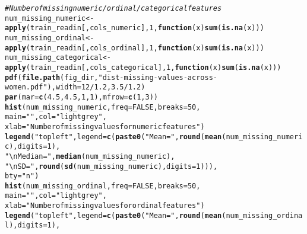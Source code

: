 \documentclass{article}\usepackage[]{graphicx}\usepackage[]{color}
\makeatletter
\newcommand{\hlnum}[1]{\textcolor[rgb]{0.686,0.059,0.569}{#1}}%
\newcommand{\hlstr}[1]{\textcolor[rgb]{0.192,0.494,0.8}{#1}}%
\newcommand{\hlcom}[1]{\textcolor[rgb]{0.678,0.584,0.686}{\textit{#1}}}%
\newcommand{\hlopt}[1]{\textcolor[rgb]{0,0,0}{#1}}%
\newcommand{\hlstd}[1]{\textcolor[rgb]{0.345,0.345,0.345}{#1}}%
\newcommand{\hlkwa}[1]{\textcolor[rgb]{0.161,0.373,0.58}{\textbf{#1}}}%
\newcommand{\hlkwb}[1]{\textcolor[rgb]{0.69,0.353,0.396}{#1}}%
\newcommand{\hlkwc}[1]{\textcolor[rgb]{0.333,0.667,0.333}{#1}}%
\newcommand{\hlkwd}[1]{\textcolor[rgb]{0.737,0.353,0.396}{\textbf{#1}}}%
\newenvironment{kframe}{%
 \def\at@end@of@kframe{}%
 \ifinner\ifhmode%
  \def\at@end@of@kframe{\end{minipage}}%
  \begin{minipage}{\columnwidth}%
 \fi\fi%
 \def\FrameCommand##1{\hskip\@totalleftmargin \hskip-\fboxsep
 \colorbox{shadecolor}{##1}\hskip-\fboxsep
     \hskip-\linewidth \hskip-\@totalleftmargin \hskip\columnwidth}%
 \MakeFramed {\advance\hsize-\width
   \@totalleftmargin\z@ \linewidth\hsize
   \@setminipage}}%
 {\par\unskip\endMakeFramed%
 \at@end@of@kframe}
\newenvironment{knitrout}{}{} %
\makeatother
\begin{document}
\begin{knitrout}
\begin{kframe}
\begin{alltt}
\hlcom{# Number of missing numeric/ordinal/categorical features}
\hlstd{num_missing_numeric} \hlkwb{<-} \hlkwd{apply}\hlstd{(train_readin[, cols_numeric],} \hlnum{1}\hlstd{,} \hlkwa{function}\hlstd{(}\hlkwc{x}\hlstd{)} \hlkwd{sum}\hlstd{(}\hlkwd{is.na}\hlstd{(x)))}
\hlstd{num_missing_ordinal} \hlkwb{<-} \hlkwd{apply}\hlstd{(train_readin[, cols_ordinal],} \hlnum{1}\hlstd{,} \hlkwa{function}\hlstd{(}\hlkwc{x}\hlstd{)} \hlkwd{sum}\hlstd{(}\hlkwd{is.na}\hlstd{(x)))}
\hlstd{num_missing_categorical} \hlkwb{<-} \hlkwd{apply}\hlstd{(train_readin[, cols_categorical],} \hlnum{1}\hlstd{,} \hlkwa{function}\hlstd{(}\hlkwc{x}\hlstd{)} \hlkwd{sum}\hlstd{(}\hlkwd{is.na}\hlstd{(x)))}
\hlkwd{pdf}\hlstd{(}\hlkwd{file.path}\hlstd{(fig_dir,} \hlstr{"dist-missing-values-across-women.pdf"}\hlstd{),} \hlkwc{width} \hlstd{=} \hlnum{12}\hlopt{/}\hlnum{1.2}\hlstd{,} \hlnum{3.5}\hlopt{/}\hlnum{1.2}\hlstd{)}
\hlkwd{par}\hlstd{(}\hlkwc{mar} \hlstd{=} \hlkwd{c}\hlstd{(}\hlnum{4.5}\hlstd{,} \hlnum{4.5}\hlstd{,} \hlnum{1}\hlstd{,} \hlnum{1}\hlstd{),} \hlkwc{mfrow} \hlstd{=} \hlkwd{c}\hlstd{(}\hlnum{1}\hlstd{,} \hlnum{3}\hlstd{))}
\hlkwd{hist}\hlstd{(num_missing_numeric,} \hlkwc{freq} \hlstd{=} \hlnum{FALSE}\hlstd{,} \hlkwc{breaks} \hlstd{=} \hlnum{50}\hlstd{,}
     \hlkwc{main} \hlstd{=} \hlstr{""}\hlstd{,} \hlkwc{col} \hlstd{=} \hlstr{"lightgrey"}\hlstd{,}
     \hlkwc{xlab} \hlstd{=} \hlstr{"Number of missing values for numeric features"}\hlstd{)}
\hlkwd{legend}\hlstd{(}\hlstr{"topleft"}\hlstd{,} \hlkwc{legend} \hlstd{=} \hlkwd{c}\hlstd{(}\hlkwd{paste0}\hlstd{(}\hlstr{"Mean = "}\hlstd{,} \hlkwd{round}\hlstd{(}\hlkwd{mean}\hlstd{(num_missing_numeric),} \hlkwc{digits} \hlstd{=} \hlnum{1}\hlstd{),}
                                    \hlstr{"\textbackslash{}nMedian = "}\hlstd{,} \hlkwd{median}\hlstd{(num_missing_numeric),}
                                    \hlstr{"\textbackslash{}nSD = "}\hlstd{,} \hlkwd{round}\hlstd{(}\hlkwd{sd}\hlstd{(num_missing_numeric),} \hlkwc{digits} \hlstd{=} \hlnum{1}\hlstd{))),}
       \hlkwc{bty} \hlstd{=} \hlstr{"n"}\hlstd{)}
\hlkwd{hist}\hlstd{(num_missing_ordinal,} \hlkwc{freq} \hlstd{=} \hlnum{FALSE}\hlstd{,} \hlkwc{breaks} \hlstd{=} \hlnum{50}\hlstd{,}
     \hlkwc{main} \hlstd{=} \hlstr{""}\hlstd{,} \hlkwc{col} \hlstd{=} \hlstr{"lightgrey"}\hlstd{,}
     \hlkwc{xlab} \hlstd{=} \hlstr{"Number of missing values for ordinal features"}\hlstd{)}
\hlkwd{legend}\hlstd{(}\hlstr{"topleft"}\hlstd{,} \hlkwc{legend} \hlstd{=} \hlkwd{c}\hlstd{(}\hlkwd{paste0}\hlstd{(}\hlstr{"Mean = "}\hlstd{,} \hlkwd{round}\hlstd{(}\hlkwd{mean}\hlstd{(num_missing_ordinal),} \hlkwc{digits} \hlstd{=} \hlnum{1}\hlstd{),}

\end{alltt}
\end{kframe}
\end{knitrout}
\end{document}
